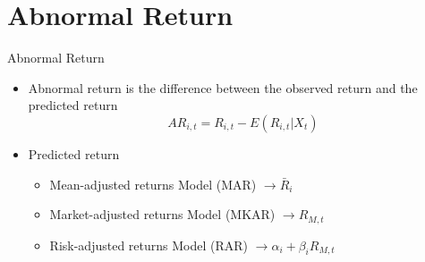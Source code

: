 \documentclass{beamer}
\begin{document}
\section{Abnormal Return}

\begin{frame}{Abnormal Return}
\begin{itemize}
\item Abnormal return  is the difference between the observed return and the predicted return
\begin{equation*}
AR_{i,t} = R_{i,t} - E(R_{i,t}|X_t)
\end{equation*}
\item Predicted return
\begin{itemize}
\item Mean-adjusted returns Model (MAR) $ \longrightarrow \bar{R}_i $
\item Market-adjusted returns Model (MKAR) $ \longrightarrow {R}_{M,t} $
\item Risk-adjusted returns Model (RAR) $ \longrightarrow \alpha_i + \beta_i{R}_{M,t} $
\end{itemize}
\end{itemize}
\end{frame}
\end{document}
